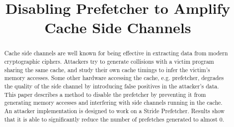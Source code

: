 \documentclass[conference]{IEEEtran}
\begin{document}
\title{Disabling Prefetcher to Amplify Cache Side Channels}


\maketitle

\begin{abstract}
Cache side channels are well known for being effective
in extracting data from modern cryptographic ciphers.
Attackers try to generate collisions with a victim program sharing
the same cache, and study their own cache timings to infer the
victim's memory accesses.
Some other hardware accessing the cache, e.g. prefetcher, degrades the
quality of the side channel by introducing false positives in the attacker's
data.
This paper describes a method to disable the prefetcher by preventing
it from generating memory accesses and interfering with side channels
running in the cache.
An attacker implementation is designed to work on a Stride Prefetcher.
Results show that it is able to significantly reduce the number of prefetches
generated to almost 0.

\end{abstract}
\end{document}
